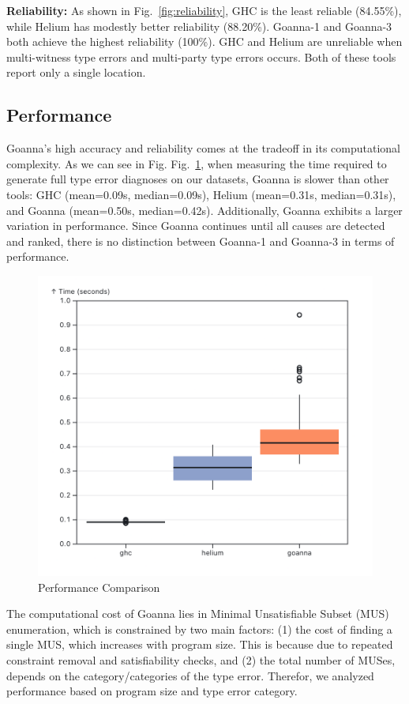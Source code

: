 \documentclass[pdflatex,sn-nature,Numbered]{sn-jnl}%
\begin{document}
\textbf{Reliability:} As shown in Fig.~\ref{fig:reliability}, GHC is the least reliable (84.55\%), while Helium has modestly better reliability (88.20\%). Goanna-1 and Goanna-3 both achieve the highest reliability (100\%). GHC and Helium are unreliable when multi-witness type errors and multi-party type errors occurs. Both of these tools report only a single location. 

\subsection{Performance} \label{sub:eval-performance}
Goanna's high accuracy and reliability comes at the tradeoff in its computational complexity. As we can see in Fig. Fig.~\ref{fig:performance}, when  measuring the time required to generate full type error diagnoses on our datasets, Goanna is slower than other tools: GHC (mean=0.09s, median=0.09s), Helium (mean=0.31s, median=0.31s), and Goanna (mean=0.50s, median=0.42s). Additionally, Goanna exhibits a larger variation in performance. Since Goanna continues until all causes are detected and ranked, there is no distinction between Goanna-1 and Goanna-3 in terms of performance.

\begin{figure}[ht!]
    \centering
    \includegraphics[width=0.7\linewidth]{images/performance-overall.png}
    \caption{Performance Comparison}
    \label{fig:performance}
\end{figure}

The computational cost of Goanna lies in Minimal Unsatisfiable Subset (MUS) enumeration, which is constrained by two main factors: (1) the cost of finding a single MUS, which increases with program size. This is because  due to repeated constraint removal and satisfiability checks, and (2) the total number of MUSes, depends on the category/categories of the type error. Therefor, we analyzed performance based on program size and type error category.
\end{document}
